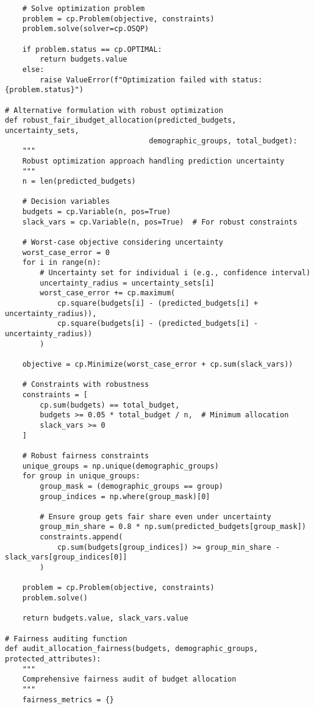 \begin{lstlisting}
    # Solve optimization problem
    problem = cp.Problem(objective, constraints)
    problem.solve(solver=cp.OSQP)
    
    if problem.status == cp.OPTIMAL:
        return budgets.value
    else:
        raise ValueError(f"Optimization failed with status: {problem.status}")

# Alternative formulation with robust optimization
def robust_fair_ibudget_allocation(predicted_budgets, uncertainty_sets, 
                                 demographic_groups, total_budget):
    """
    Robust optimization approach handling prediction uncertainty
    """
    n = len(predicted_budgets)
    
    # Decision variables
    budgets = cp.Variable(n, pos=True)
    slack_vars = cp.Variable(n, pos=True)  # For robust constraints
    
    # Worst-case objective considering uncertainty
    worst_case_error = 0
    for i in range(n):
        # Uncertainty set for individual i (e.g., confidence interval)
        uncertainty_radius = uncertainty_sets[i]
        worst_case_error += cp.maximum(
            cp.square(budgets[i] - (predicted_budgets[i] + uncertainty_radius)),
            cp.square(budgets[i] - (predicted_budgets[i] - uncertainty_radius))
        )
    
    objective = cp.Minimize(worst_case_error + cp.sum(slack_vars))
    
    # Constraints with robustness
    constraints = [
        cp.sum(budgets) == total_budget,
        budgets >= 0.05 * total_budget / n,  # Minimum allocation
        slack_vars >= 0
    ]
    
    # Robust fairness constraints
    unique_groups = np.unique(demographic_groups)
    for group in unique_groups:
        group_mask = (demographic_groups == group)
        group_indices = np.where(group_mask)[0]
        
        # Ensure group gets fair share even under uncertainty
        group_min_share = 0.8 * np.sum(predicted_budgets[group_mask])
        constraints.append(
            cp.sum(budgets[group_indices]) >= group_min_share - slack_vars[group_indices[0]]
        )
    
    problem = cp.Problem(objective, constraints)
    problem.solve()
    
    return budgets.value, slack_vars.value

# Fairness auditing function
def audit_allocation_fairness(budgets, demographic_groups, protected_attributes):
    """
    Comprehensive fairness audit of budget allocation
    """
    fairness_metrics = {}
    

\end{lstlisting}
